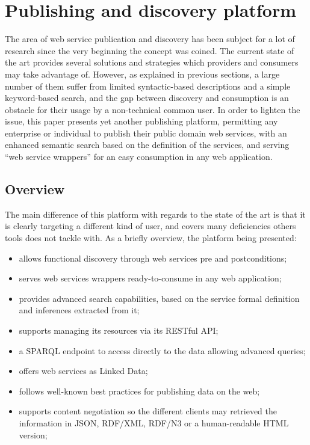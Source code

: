 
\section{Publishing and discovery platform}
\label{sec:discovery}

The area of web service publication and discovery has been subject for a lot of research since the very beginning the concept was coined. The current state of the art provides several solutions and strategies which providers and consumers may take advantage of. However, as explained in previous sections, a large number of them suffer from limited syntactic-based descriptions and a simple keyword-based search, and the gap between discovery and consumption is an obstacle for their usage by a non-technical common user. In order to lighten the issue, this paper presents yet another publishing platform, permitting any enterprise or individual to publish their public domain web services, with an enhanced semantic search based on the definition of the services, and serving ``web service wrappers'' for an easy consumption in any web application.

\subsection{Overview}
\label{ssec:overview}

The main difference of this platform with regards to the state of the art is that it is clearly targeting a different kind of user, and covers many deficiencies others tools does not tackle with. As a briefly overview, the platform being presented:

\begin{itemize}
  \item allows functional discovery through web services pre and postconditions;
	\item serves web services wrappers ready-to-consume in any web application;
	\item provides advanced search capabilities, based on the service formal definition and inferences extracted from it;
	\item supports managing its resources via its RESTful API;
	\item a SPARQL endpoint to access directly to the data allowing advanced queries;
	\item offers web services as Linked Data;
	\item follows well-known best practices for publishing data on the web;
	\item supports content negotiation so the different clients may retrieved the information in JSON, RDF/XML, RDF/N3 or a human-readable HTML version;
\end{itemize}

